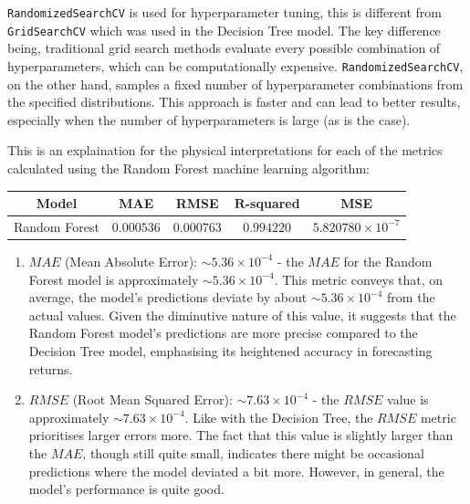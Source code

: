 \documentclass[a4paper,12pt,titlepage]{article}
\numberwithin{equation}{section}
\begin{document}
\texttt{RandomizedSearchCV} is used for hyperparameter tuning, this is different from \texttt{GridSearchCV}
which was used in the Decision Tree model. The key difference being, traditional grid search methods evaluate 
every possible combination of hyperparameters, which can be computationally expensive. \texttt{RandomizedSearchCV}, 
on the other hand, samples a fixed number of hyperparameter combinations from the specified distributions. 
This approach is faster and can lead to better results, especially when the number of hyperparameters is large (as is the case).

\begin{tcolorbox}[colback=red!5, colframe=red!75!black, title=\textbf{Random Forest Model Analysis}]

This is an explaination for the physical interpretations for each of the metrics calculated using the 
Random Forest machine learning algorithm:
	
\begin{center}
		
	\begin{tabular}{|c|c|c|c|c|}
	\hline
	\textbf{Model} & \textbf{MAE} & \textbf{RMSE} & \textbf{$\textbf{R}$-squared} & \textbf{MSE} \\
	\hline
	Random Forest & $0.000536$ & $0.000763$ & $0.994220$ & $5.820780 \times 10^{-7}$ \\
	\hline
	\end{tabular}
	
\end{center}
	
\begin{enumerate}

	\item $MAE$ (Mean Absolute Error): $\sim 5.36 \times 10^{-4}$ - the $MAE$ for the Random Forest model is 
		approximately $\sim 5.36 \times 10^{-4}$. This metric conveys that, on average, the model's predictions 
		deviate by about $\sim 5.36 \times 10^{-4}$ from the actual values. Given the diminutive nature of this 
		value, it suggests that the Random Forest model's predictions are more precise compared to the 
		Decision Tree model, emphasising its heightened accuracy in forecasting returns.
	
	\item $RMSE$ (Root Mean Squared Error): $\sim 7.63 \times 10^{-4}$ - the $RMSE$ value is approximately 
		$\sim 7.63 \times 10^{-4}$. Like with the Decision Tree, the $RMSE$ metric prioritises larger errors more. 
		The fact that this value is slightly larger than the $MAE$, though still quite small, indicates there might 
		be occasional predictions where the model deviated a bit more. However, in general, the model's 
		performance is quite good.
	

\end{enumerate}
\end{tcolorbox}
\end{document}
